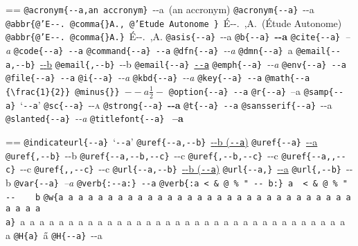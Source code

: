 \documentclass{book}
\makeatletter
\newcommand\Texinfocommandstyletextcite[1]{{\normalfont{}\textsl{#1}}}%
\newcommand\Texinfocommandstyletextkbd[1]{{\ttfamily\textsl{#1}}}%
\newcommand\Texinfocommandstyletextvar[1]{{\normalfont{}\textsl{#1}}}%
\newenvironment{Texinfopreformatted}{%
  \par\GNUTobeylines\obeyspaces\frenchspacing\parskip=\z@\parindent=\z@}{}
{\catcode`\^^M=13 \gdef\GNUTobeylines{\catcode`\^^M=13 \def^^M{\null\par}}}
\newenvironment{Texinfoindented}{\begin{list}{}{}\item\relax}{\end{list}}
\renewcommand{\_}{\Texinfounderscore\discretionary{}{}{}}
\makeatother
\begin{document}
\begin{Texinfoindented}
\begin{Texinfopreformatted}
\texttt{@acronym\{{-}{-}a,an accronym\}}\ {-}{-}a\ (an accronym)
\texttt{@acronym\{{-}{-}a\}}\ {-}{-}a
\texttt{@abbr\{@'E{-}{-}.\ @comma\{\}A.,\ @'Etude Autonome \}}\ \'{E}{-}{-}.\@\ ,A.\@\ (\'{E}tude Autonome)
\texttt{@abbr\{@'E{-}{-}.\ @comma\{\}A.\}}\ \'{E}{-}{-}.\@\ ,A.\@
\texttt{@asis\{{-}{-}a\}}\ {-}{-}a
\texttt{@b\{{-}{-}a\}}\ \textbf{{-}{-}a}
\texttt{@cite\{{-}{-}a\}}\ \Texinfocommandstyletextcite{--a}
\texttt{@code\{{-}{-}a\}}\ \texttt{{-}{-}a}
\texttt{@command\{{-}{-}a\}}\ \texttt{{-}{-}a}
\texttt{@dfn\{{-}{-}a\}}\ \textsl{{-}{-}a}
\texttt{@dmn\{{-}{-}a\}}\ \thinspace {-}{-}a
\texttt{@email\{{-}{-}a,{-}{-}b\}}\ \href{mailto:--a}{{-}{-}b}
\texttt{@email\{,{-}{-}b\}}\ {-}{-}b
\texttt{@email\{{-}{-}a\}}\ \href{mailto:--a}{\nolinkurl{--a}}
\texttt{@emph\{{-}{-}a\}}\ \emph{{-}{-}a}
\texttt{@env\{{-}{-}a\}}\ \texttt{{-}{-}a}
\texttt{@file\{{-}{-}a\}}\ \texttt{{-}{-}a}
\texttt{@i\{{-}{-}a\}}\ \textit{{-}{-}a}
\texttt{@kbd\{{-}{-}a\}}\ \Texinfocommandstyletextkbd{{-}{-}a}
\texttt{@key\{{-}{-}a\}}\ \texttt{{-}{-}a}
\texttt{@math\{{-}{-}a \{\textbackslash{}frac\{1\}\{2\}\}\ @minus\{\}\}}\ $--a {\frac{1}{2}} -$
\texttt{@option\{{-}{-}a\}}\ \texttt{{-}{-}a}
\texttt{@r\{{-}{-}a\}}\ \textnormal{--a}
\texttt{@samp\{{-}{-}a\}}\ `\texttt{{-}{-}a}'
\texttt{@sc\{{-}{-}a\}}\ \textsc{{-}{-}a}
\texttt{@strong\{{-}{-}a\}}\ \textbf{{-}{-}a}
\texttt{@t\{{-}{-}a\}}\ \texttt{{-}{-}a}
\texttt{@sansserif\{{-}{-}a\}}\ \textsf{{-}{-}a}
\texttt{@slanted\{{-}{-}a\}}\ \textsl{{-}{-}a}
\texttt{@titlefont\{{-}{-}a\}}\ \end{Texinfopreformatted}
{\huge \bfseries --a}\begin{Texinfopreformatted}%
\ttfamily 
\texttt{@indicateurl\{{-}{-}a\}}\ `\texttt{{-}{-}a}'
\texttt{@uref\{{-}{-}a,{-}{-}b\}}\ \href{--a}{{-}{-}b (\nolinkurl{--a})}
\texttt{@uref\{{-}{-}a\}}\ \url{--a}
\texttt{@uref\{,{-}{-}b\}}\ {-}{-}b
\texttt{@uref\{{-}{-}a,{-}{-}b,{-}{-}c\}}\ {-}{-}c
\texttt{@uref\{,{-}{-}b,{-}{-}c\}}\ {-}{-}c
\texttt{@uref\{{-}{-}a{,}{,}{-}{-}c\}}\ {-}{-}c
\texttt{@uref\{{,}{,}{-}{-}c\}}\ {-}{-}c
\texttt{@url\{{-}{-}a,{-}{-}b\}}\ \href{--a}{{-}{-}b (\nolinkurl{--a})}
\texttt{@url\{{-}{-}a,\}}\ \url{--a}
\texttt{@url\{,{-}{-}b\}}\ {-}{-}b
\texttt{@var\{{-}{-}a\}}\ \Texinfocommandstyletextvar{--a}
\texttt{@verb\{:{-}{-}a:\}}\ \verb:--a:
\texttt{@verb\{:a  < \& @\ \% " {-}{-}    b:\}}\ \verb:a  < & @ % " --    b:
\texttt{@w\{a a a a a a a a a a a a a a a a a a a a a a a a a a a a a a a a a a a\}}\ \hbox{a a a a a a a a a a a a a a a a a a a a a a a a a a a a a a a a a a a}
\texttt{@H\{a\}}\ \H{a}
\texttt{@H\{{-}{-}a\}}\ \H{{-}{-}a}

\end{Texinfopreformatted}
\end{Texinfoindented}
\end{document}
